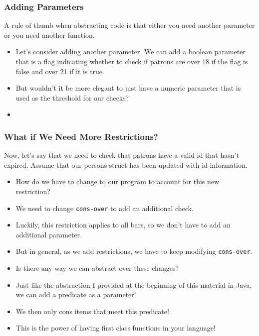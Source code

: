 \documentclass{beamer}
\begin{document}
\begin{frame}
  \frametitle{Adding Parameters}
  A rule of thumb when abstracting code is that either you need
  another parameter or you need another function.
  \begin{itemize}
  \item<2-> Let's consider adding another parameter. We can add a boolean parameter that is a flag indicating
    whether to check if patrons are over 18 if the flag is false and over
    21 if it is true.
  \item<4-> But wouldn't it be more elegant to just have a numeric parameter
    that is used as the threshold for our checks?
  \item<5-> 
    \BarAbstracted
  \end{itemize}
\end{frame}

\begin{frame}
  \frametitle{What if We Need More Restrictions?}
  Now, let's say that we need to check that patrons have a valid id that
  hasn't expired. Assume that our persons struct has been updated with id
  information.
  \begin{itemize}
  \item<2-> How do we have to change to our program to account for this new
    restriction?
  \item<3-> We need to change \texttt{cons-over} to add an additional
    check.
  \item<4-> Luckily, this restriction applies to all bars, so we don't have to
    add an additional parameter.
  \item<5-> But in general, as we add restrictions, we have to keep modifying
    \texttt{cons-over}.
  \item<6-> Is there any way we can abstract over these changes?
  \item<7-> Just like the abstraction I provided at the beginning of this material
    in Java, we can add a predicate as a parameter!
  \item<8-> We then only cons items that meet this predicate!
  \item<9-> This is the power of having first class functions in your
    language!
  \end{itemize}
\end{frame}

\end{document}
